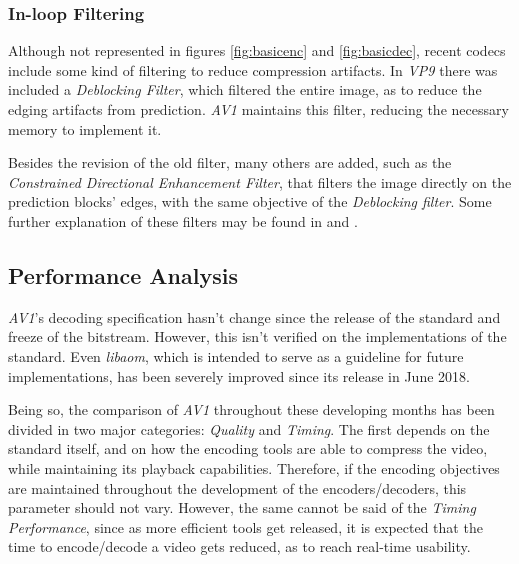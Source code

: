 \subsubsection{In-loop Filtering}

Although not represented in figures \ref{fig:basicenc} and \ref{fig:basicdec}, recent codecs include some kind of filtering to reduce compression artifacts. In \emph{VP9} there was included a \emph{Deblocking Filter}, which filtered the entire image, as to reduce the edging artifacts from prediction. \emph{AV1} maintains this filter, reducing the necessary memory to implement it. 

Besides the revision of the old filter, many others are added, such as the \emph{Constrained Directional Enhancement Filter}, that filters the image directly on the prediction blocks' edges, with the same objective of the \emph{Deblocking filter}. Some further explanation of these filters may be found in \cite{norkinFilmGrainSynthesis2018} and \cite{midtskogenAv1ConstrainedDirectional2018}.

%

\subsection{Performance Analysis}

\emph{AV1}'s decoding specification hasn't change since the release of the standard and freeze of the bitstream. However, this isn't verified on the implementations of the standard. Even \emph{libaom}, which is intended to serve as a guideline for future implementations, has been severely improved since its release in June 2018. 

Being so, the comparison of \emph{AV1} throughout these developing months has been divided in two major categories: \emph{Quality} and \emph{Timing}. The first depends on the standard itself, and on how the encoding tools are able to compress the video, while maintaining its playback capabilities. Therefore, if the encoding objectives are maintained throughout the development of the encoders/decoders, this parameter should not vary. However, the same cannot be said of the \emph{Timing Performance}, since as more efficient tools get released, it is expected that the time to encode/decode a video gets reduced, as to reach real-time usability.


